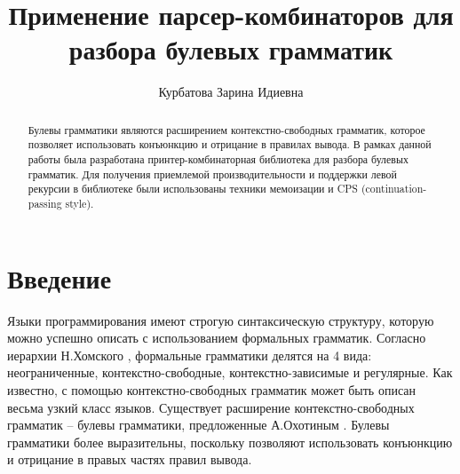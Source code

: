 \title{Применение парсер-комбинаторов для разбора булевых грамматик}


\author{Курбатова Зарина Идиевна}



\maketitle

\begin{abstract}
  Булевы грамматики являются расширением контекстно-свободных грамматик, которое позволяет
  использовать конъюнкцию и отрицание в правилах вывода. В рамках данной работы была
  разработана принтер-комбинаторная библиотека для разбора булевых грамматик. Для
  получения приемлемой производительности и поддержки левой рекурсии в библиотеке были
  использованы техники мемоизации и CPS (continuation-passing style).
\end{abstract}

\section*{Введение} 
Языки программирования имеют строгую синтаксическую структуру, которую можно успешно описать с использованием формальных грамматик. Согласно иерархии Н.Хомского \cite{chomsky1956three}, формальные грамматики делятся на 4 вида:  неограниченные, контекстно-свободные, контекстно-зависимые и регулярные. Как известно, с помощью контекстно-свободных грамматик может быть описан весьма узкий класс языков. Существует расширение контекстно-свободных грамматик -- булевы грамматики, предложенные А.Охотиным \cite{okhotin2004boolean}. Булевы грамматики более выразительны, поскольку позволяют использовать конъюнкцию и отрицание в правых частях правил вывода.


